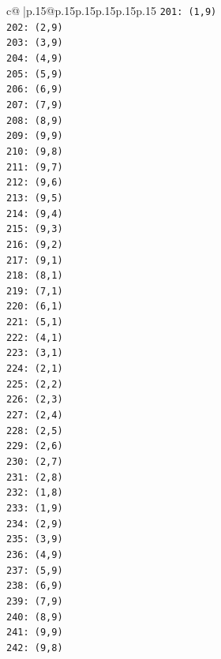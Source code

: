 \documentclass{article}
\begin{document}
{\begin{supertabular}{c@{$\;$}|p{.15\linewidth}@{}p{.15\linewidth}p{.15\linewidth}p{.15\linewidth}p{.15\linewidth}p{.15\linewidth}}
{{{\texttt{201: (1,9)} \\
\texttt{202: (2,9)} \\
\texttt{203: (3,9)} \\
\texttt{204: (4,9)} \\
\texttt{205: (5,9)} \\
\texttt{206: (6,9)} \\
\texttt{207: (7,9)} \\
\texttt{208: (8,9)} \\
\texttt{209: (9,9)} \\
\texttt{210: (9,8)} \\
\texttt{211: (9,7)} \\
\texttt{212: (9,6)} \\
\texttt{213: (9,5)} \\
\texttt{214: (9,4)} \\
\texttt{215: (9,3)} \\
\texttt{216: (9,2)} \\
\texttt{217: (9,1)} \\
\texttt{218: (8,1)} \\
\texttt{219: (7,1)} \\
\texttt{220: (6,1)} \\
\texttt{221: (5,1)} \\
\texttt{222: (4,1)} \\
\texttt{223: (3,1)} \\
\texttt{224: (2,1)} \\
\texttt{225: (2,2)} \\
\texttt{226: (2,3)} \\
\texttt{227: (2,4)} \\
\texttt{228: (2,5)} \\
\texttt{229: (2,6)} \\
\texttt{230: (2,7)} \\
\texttt{231: (2,8)} \\
\texttt{232: (1,8)} \\
\texttt{233: (1,9)} \\
\texttt{234: (2,9)} \\
\texttt{235: (3,9)} \\
\texttt{236: (4,9)} \\
\texttt{237: (5,9)} \\
\texttt{238: (6,9)} \\
\texttt{239: (7,9)} \\
\texttt{240: (8,9)} \\
\texttt{241: (9,9)} \\
\texttt{242: (9,8)} \\
}}}
\end{supertabular}}
\end{document}
